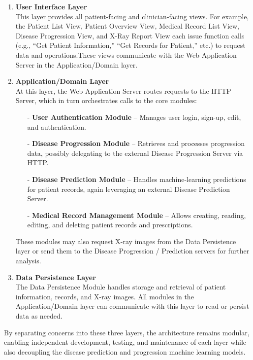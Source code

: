 \documentclass[12pt, titlepage]{article}
\begin{document}
\begin{enumerate}
    \item \textbf{User Interface Layer} \\
    This layer provides all patient-facing and clinician-facing views. For example, the Patient List View, Patient Overview View, Medical Record List View, Disease Progression View, and X-Ray Report View each issue function calls (e.g., ``Get Patient Information,'' ``Get Records for Patient,'' etc.) to request data and operations.These views communicate with the Web Application Server in the Application/Domain layer.

    \item \textbf{Application/Domain Layer} \\
    At this layer, the Web Application Server routes requests to the HTTP Server, which in turn orchestrates calls to the core modules:
    \begin{itemize}
        \item[-] \textbf{User Authentication Module} -- Manages user login, sign-up, edit, and authentication.
        \item[-] \textbf{Disease Progression Module} -- Retrieves and processes progression data, possibly delegating to the external Disease Progression Server via HTTP.
        \item[-] \textbf{Disease Prediction Module} -- Handles machine-learning predictions for patient records, again leveraging an external Disease Prediction Server.
        \item[-] \textbf{Medical Record Management Module} -- Allows creating, reading, editing, and deleting patient records and prescriptions.
    \end{itemize}
    These modules may also request X-ray images from the Data Persistence layer or send them to the Disease Progression / Prediction servers for further analysis.

    \item \textbf{Data Persistence Layer} \\
    The Data Persistence Module handles storage and retrieval of patient information, records, and X-ray images. All modules in the Application/Domain layer can communicate with this layer to read or persist data as needed.
\end{enumerate}

\noindent By separating concerns into these three layers, the architecture remains modular, enabling independent development, testing, and maintenance of each layer while also decoupling the disease prediction and progression machine learning models.
\end{document}

